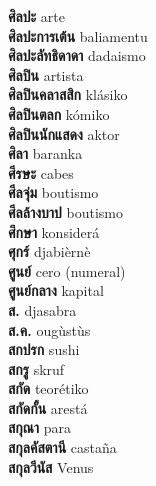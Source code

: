 \textbf{ ศิลปะ  } arte \\
\textbf{ ศิลปะการเต้น  } baliamentu \\
\textbf{ ศิลปะลัทธิดาดา  } dadaismo \\
\textbf{ ศิลปิน  } artista \\
\textbf{ ศิลปินคลาสสิก  } klásiko \\
\textbf{ ศิลปินตลก  } kómiko \\
\textbf{ ศิลปินนักแสดง  } aktor \\
\textbf{ ศิลา  } baranka \\
\textbf{ ศีรษะ  } cabes \\
\textbf{ ศีลจุ่ม  } boutismo \\
\textbf{ ศีลล้างบาป  } boutismo \\
\textbf{ ศึกษา  } konsiderá \\
\textbf{ ศุกร์  } djabièrnè \\
\textbf{ ศูนย์  } cero (numeral) \\
\textbf{ ศูนย์กลาง  } kapital \\
\textbf{ ส.  } djasabra \\
\textbf{ ส.ค.  } ougùstùs \\
\textbf{ สกปรก  } sushi \\
\textbf{ สกรู  } skruf \\
\textbf{ สกัด  } teorétiko \\
\textbf{ สกัดกั้น  } arestá \\
\textbf{ สกุณา  } para \\
\textbf{ สกุลคัสตานี  } castaña \\
\textbf{ สกุลวีนัส  } Venus \\
